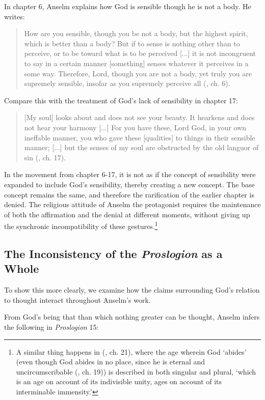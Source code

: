 \documentclass[]{birkjour}
\begin{document}
In chapter 6, Anselm explains how God is sensible though he is not a body. He writes:
	
\begin{quote}
How are you sensible, though you be not a body, but the highest spirit, which is better than a body? But if to sense is nothing other than to perceive, or to be toward what is to be perceived [...] it is not incongruent to say in a certain manner [something] senses whatever it perceives in a some way. Therefore, Lord, though you are not a body, yet truly you are supremely sensible, insofar as you supremely perceive all (\cite{AnselmPros}, ch. 6).
\end{quote}
Compare this with the treatment of God's lack of sensibility in chapter 17:
	
\begin{quote}
[My soul] looks about and does not see your beauty. It hearkens and does not hear your harmony [...] For you have these, Lord God, in your own ineffable manner, you who gave these [qualities] to things in their sensible manner; [...] but the senses of my soul are obstructed by the old languor of sin (\cite{AnselmPros}, ch. 17).
\end{quote}
	
In the movement from chapter 6-17, it is not as if the concept of sensibility were expanded to include God's sensibility, thereby creating a new concept. The base concept remains the same, and therefore the rarification of the earlier chapter is denied. The religious attitude of Anselm the protagonist requires the maintenance of both the affirmation and the denial at different moments, without giving up the synchronic incompatibility of these gestures.\footnote{A similar thing happens in (\cite{AnselmPros}, ch. 21), where the age wherein God `abides' (even though God abides in no place, since he is eternal and uncircumscribable (\cite{AnselmPros}, ch. 19))  is described in both singular and plural, `which is an age on account of its indivisible unity, ages on account of its interminable immensity.'} 
\subsection{The Inconsistency of the \textit{Proslogion} as a Whole}
To show this more clearly, we examine how the claims surrounding God's relation to thought interact throughout Anselm's work. 
	
From God's being that than which nothing greater can be thought, Anselm infers the following in \textit{Proslogion} 15:
	
\end{document}

